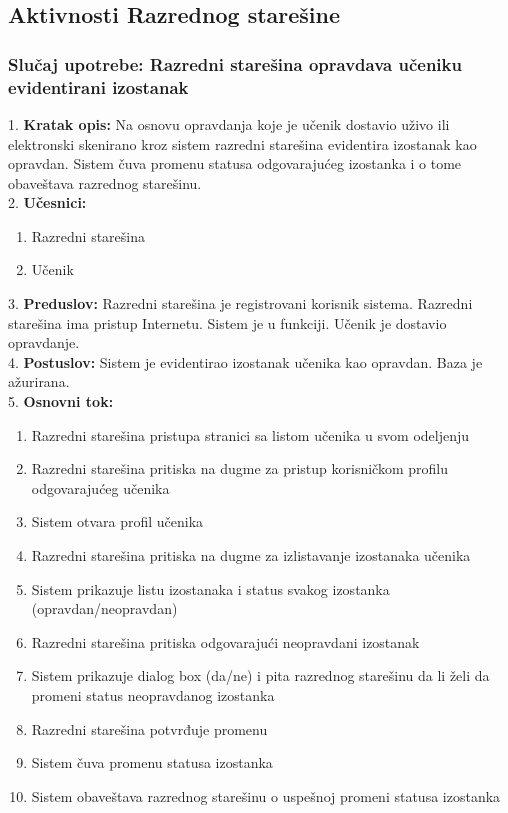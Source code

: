 \documentclass{article}
\begin{document}
\newpage
\subsection{Aktivnosti Razrednog starešine}

\subsubsection{Slučaj upotrebe: Razredni starešina opravdava učeniku evidentirani izostanak}
1. \textbf{Kratak opis:} Na osnovu opravdanja koje je učenik dostavio uživo ili elektronski skenirano kroz sistem razredni starešina evidentira izostanak kao opravdan. Sistem čuva promenu statusa odgovarajućeg izostanka i o tome obaveštava razrednog starešinu. \\

2. \textbf{Učesnici:}
\begin{enumerate} [label=(\alph*)]
\item Razredni starešina
\item Učenik
\end{enumerate} 

3. \textbf{Preduslov:} Razredni starešina je registrovani korisnik sistema. Razredni starešina ima pristup Internetu. Sistem je u funkciji. Učenik je dostavio opravdanje. \\

4. \textbf{Postuslov:} Sistem je evidentirao izostanak učenika kao opravdan. Baza je ažurirana. \\

5. \textbf{Osnovni tok:} 
\begin{enumerate} [label=(\alph*)]
\item Razredni starešina pristupa stranici sa listom učenika u svom odeljenju
\item Razredni starešina pritiska na dugme za pristup korisničkom profilu odgovarajućeg učenika
\item Sistem otvara profil učenika
\item Razredni starešina pritiska na dugme za izlistavanje izostanaka učenika
\item Sistem prikazuje listu izostanaka i status svakog izostanka (opravdan/neopravdan)
\item Razredni starešina pritiska odgovarajući neopravdani izostanak
\item Sistem prikazuje dialog box (da/ne) i pita razrednog starešinu da li želi da promeni status neopravdanog izostanka
\item Razredni starešina potvrđuje promenu
\item Sistem čuva promenu statusa izostanka
\item Sistem obaveštava razrednog starešinu o uspešnoj promeni statusa izostanka
\end{enumerate}
\end{document}

